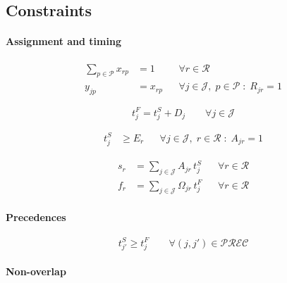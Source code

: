 \subsection{Constraints}

\paragraph{Assignment and timing}

\begin{align}
\sum_{p \in \mathcal{P}} x_{rp} &= 1 
&& \forall r \in \mathcal{R} \\
%
y_{jp} &= x_{r p} 
&& \forall j \in \mathcal{J}, \; p \in \mathcal{P}\; :\; R_{jr} = 1
\end{align}


\begin{equation}
t^{F}_j = t^{S}_j + D_j
\qquad \forall j \in \mathcal{J}
\end{equation}


\begin{align}
t^S_j &\ge E_r 
&& \forall j \in \mathcal{J}, \; r \in \mathcal{R} \; : \; A_{jr} = 1 
\end{align}


\begin{align}
s_r & = \sum_{j \in \mathcal{J}} A_{jr}\, t^{S}_j
&& \forall r \in \mathcal{R}
\\
f_r & = \sum_{j \in \mathcal{J}} \Omega_{jr}\, t^{F}_j
&& \forall r \in \mathcal{R}
\end{align}

\paragraph{Precedences}

\begin{equation}
t^{S}_{j'} \ge t^{F}_j
\qquad \forall (j,j') \in \mathcal{PREC}
\end{equation}


\paragraph{Non-overlap}

